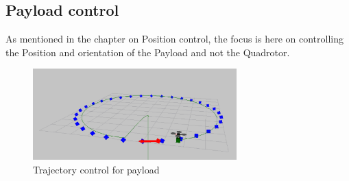 \documentclass[hidelinks,BTech]{iitmdiss}
\begin{document}
\subsection{Payload control}
As mentioned in the chapter on Position control, the focus is here on controlling the Position and orientation of the Payload and not the Quadrotor. 

\begin{figure}[H]
  \centering
    \includegraphics[width=0.7\textwidth]{Pure_Pursuit_payload.png}
    \caption{Trajectory control for payload}
\end{figure}
\end{document}
